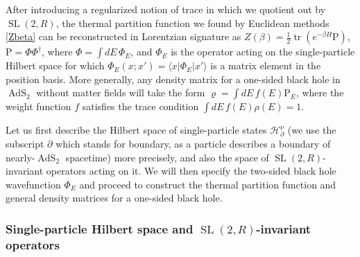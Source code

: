 \documentclass[11pt]{article}
\newcommand*{\bra}[1]{\langle{#1}|}
\newcommand*{\ket}[1]{|{#1}\rangle}
\newcommand{\calH}{\mathcal{H}}
\newcommand{\RR}{\mathbb{R}}
\DeclareMathOperator{\tr}{tr}
\DeclareMathOperator{\tSL}{\widetilde{\mathrm{SL}}}
\DeclareMathOperator{\tAdS}{\widetilde{AdS}}
\newcommand{\Rho}{\mathrm{P}}
\newcommand{\p}{\partial}
\def\widetilde#1{#1}%
\def\RR{R}
\begin{document}
After introducing a regularized notion of trace in which we quotient out by $\tSL(2,\RR)$, the thermal partition function we found by Euclidean methods \eqref{Zbeta} can be reconstructed in Lorentzian signature as $Z(\beta)=\frac{1}{2}\tr(e^{-\beta H} \Rho)$,\, $\Rho=\Phi \Phi^{\dagger}$, where $\Phi=\int dE\, \Phi_E$, and $\Phi_E$ is the operator acting on the single-particle Hilbert space for which $\Phi_E(x;x')=\bra{x}\Phi_E \ket{x'}$ is a matrix element in the position basis. More generally, any density matrix for a one-sided black hole in $\tAdS_2$ without matter fields will take the form $\varrho = \int dE\, f(E) \Rho_E$, where the weight function $f$ satisfies the trace condition $\int dE\, f(E) \rho(E)=1$.

Let us first describe the Hilbert space of single-particle states $\calH^{\nu}_{\p}$ (we use the subscript $\p$ which stands for boundary, as a particle describes a boundary of nearly-$\tAdS_2$ spacetime) more precisely, and also the space of $\tSL(2,\RR)$-invariant operators acting on it. We will then specify the two-sided black hole wavefunction $\Phi_E$ and proceed to construct the thermal partition function and general density matrices for  a one-sided black hole.


\subsubsection{Single-particle Hilbert space and $\tSL(2,\RR)$-invariant operators}
\end{document}
